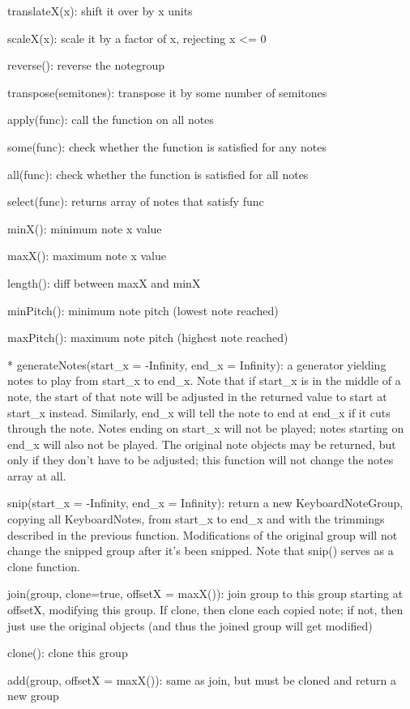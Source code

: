 \documentclass{article}
\begin{document}
translateX(x): shift it over by x units

scaleX(x): scale it by a factor of x, rejecting x <= 0

reverse(): reverse the notegroup

transpose(semitones): transpose it by some number of semitones

apply(func): call the function on all notes

some(func): check whether the function is satisfied for any notes

all(func): check whether the function is satisfied for all notes

select(func): returns array of notes that satisfy func

minX(): minimum note x value

maxX(): maximum note x value

length(): diff between maxX and minX

minPitch(): minimum note pitch (lowest note reached)

maxPitch(): maximum note pitch (highest note reached)

* generateNotes(start\_x = -Infinity, end\_x = Infinity): a generator yielding notes to play from start\_x to end\_x. Note that if start\_x is in the middle of a note, the start of that note will be adjusted in the returned value to start at start\_x instead. Similarly, end\_x will tell the note to end at end\_x if it cuts through the note. Notes ending on start\_x will not be played; notes starting on end\_x will also not be played. The original note objects may be returned, but only if they don't have to be adjusted; this function will not change the notes array at all.

snip(start\_x = -Infinity, end\_x = Infinity): return a new KeyboardNoteGroup, copying all KeyboardNotes, from start\_x to end\_x and with the trimmings described in the previous function. Modifications of the original group will not change the snipped group after it's been snipped. Note that snip() serves as a clone function.

join(group, clone=true, offsetX = maxX()): join group to this group starting at offsetX, modifying this group. If clone, then clone each copied note; if not, then just use the original objects (and thus the joined group will get modified)

clone(): clone this group

add(group, offsetX = maxX()): same as join, but must be cloned and return a new group
\end{document}
